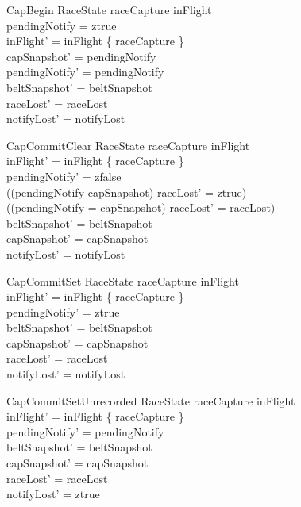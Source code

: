 \documentclass[a4paper,10pt,fleqn]{article}
\begin{document}
\begin{schema}{CapBegin}
  \Delta RaceState
  \where
  raceCapture \notin inFlight \\
  pendingNotify = ztrue \\
  inFlight' = inFlight \cup \{ raceCapture \} \\
  capSnapshot' = pendingNotify \\
  pendingNotify' = pendingNotify \\
  beltSnapshot' = beltSnapshot \\
  raceLost' = raceLost \\
  notifyLost' = notifyLost
\end{schema}

\begin{schema}{CapCommitClear}
  \Delta RaceState
  \where
  raceCapture \in inFlight \\
  inFlight' = inFlight \setminus \{ raceCapture \} \\
  pendingNotify' = zfalse \\
  ((pendingNotify \neq capSnapshot) \implies raceLost' = ztrue) \\
  ((pendingNotify = capSnapshot) \implies raceLost' = raceLost) \\
  beltSnapshot' = beltSnapshot \\
  capSnapshot' = capSnapshot \\
  notifyLost' = notifyLost
\end{schema}

\begin{schema}{CapCommitSet}
  \Delta RaceState
  \where
  raceCapture \in inFlight \\
  inFlight' = inFlight \setminus \{ raceCapture \} \\
  pendingNotify' = ztrue \\
  beltSnapshot' = beltSnapshot \\
  capSnapshot' = capSnapshot \\
  raceLost' = raceLost \\
  notifyLost' = notifyLost
\end{schema}

\begin{schema}{CapCommitSetUnrecorded}
  \Delta RaceState
  \where
  raceCapture \in inFlight \\
  inFlight' = inFlight \setminus \{ raceCapture \} \\
  pendingNotify' = pendingNotify \\
  beltSnapshot' = beltSnapshot \\
  capSnapshot' = capSnapshot \\
  raceLost' = raceLost \\
  notifyLost' = ztrue
\end{schema}
\end{document}
